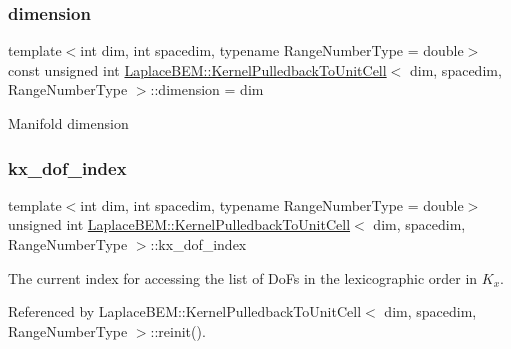 \subsubsection{\texorpdfstring{dimension}{dimension}}
{\footnotesize\ttfamily template$<$int dim, int spacedim, typename Range\+Number\+Type = double$>$ \\
const unsigned int \hyperlink{classLaplaceBEM_1_1KernelPulledbackToUnitCell}{Laplace\+B\+E\+M\+::\+Kernel\+Pulledback\+To\+Unit\+Cell}$<$ dim, spacedim, Range\+Number\+Type $>$\+::dimension = dim\hspace{0.3cm}{\ttfamily [static]}}

Manifold dimension \mbox{\label{classLaplaceBEM_1_1KernelPulledbackToUnitCell_a66ba57ad86025978e5e5580c822aef89}} 
\subsubsection{\texorpdfstring{kx\+\_\+dof\+\_\+index}{kx\_dof\_index}}
{\footnotesize\ttfamily template$<$int dim, int spacedim, typename Range\+Number\+Type = double$>$ \\
unsigned int \hyperlink{classLaplaceBEM_1_1KernelPulledbackToUnitCell}{Laplace\+B\+E\+M\+::\+Kernel\+Pulledback\+To\+Unit\+Cell}$<$ dim, spacedim, Range\+Number\+Type $>$\+::kx\+\_\+dof\+\_\+index\hspace{0.3cm}{\ttfamily [private]}}

The current index for accessing the list of Do\+Fs in the lexicographic order in $K_x$. 

Referenced by Laplace\+B\+E\+M\+::\+Kernel\+Pulledback\+To\+Unit\+Cell$<$ dim, spacedim, Range\+Number\+Type $>$\+::reinit().

\mbox{\label{classLaplaceBEM_1_1KernelPulledbackToUnitCell_ac7667f6cacebaed1a6ba39d67211db04}} 
